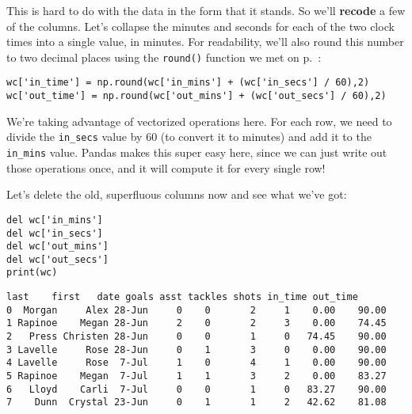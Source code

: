 
This is hard to do with the data in the form that it stands. So we'll
\textbf{recode} a few of the columns. Let's collapse the minutes and seconds
for each of the two clock times into a single value, in minutes. For
readability, we'll also round this number to two decimal places using the
\texttt{round()} function we met on p.~\pageref{round}:

\begin{Verbatim}[fontsize=\small,samepage=true,frame=single,framesep=3mm]
wc['in_time'] = np.round(wc['in_mins'] + (wc['in_secs'] / 60),2)
wc['out_time'] = np.round(wc['out_mins'] + (wc['out_secs'] / 60),2)
\end{Verbatim}


We're taking advantage of vectorized operations here. For each row, we need to
divide the \texttt{in\_secs} value by 60 (to convert it to minutes) and add it
to the \texttt{in\_mins} value. Pandas makes this super easy here, since we can
just write out those operations once, and it will compute it for every single
row!

\medskip
Let's delete the old, superfluous columns now and see what we've got:

\begin{samepage}
\begin{Verbatim}[fontsize=\small,samepage=true,frame=single,framesep=3mm]
del wc['in_mins']
del wc['in_secs']
del wc['out_mins']
del wc['out_secs']
print(wc)
\end{Verbatim}
\vspace{-.2in}

\begin{Verbatim}[fontsize=\footnotesize,samepage=true,frame=leftline,framesep=5mm,framerule=1mm]
     last    first   date goals asst tackles shots in_time out_time
0  Morgan     Alex 28-Jun     0    0       2     1    0.00    90.00
1 Rapinoe    Megan 28-Jun     2    0       2     3    0.00    74.45
2   Press Christen 28-Jun     0    0       1     0   74.45    90.00
3 Lavelle     Rose 28-Jun     0    1       3     0    0.00    90.00
4 Lavelle     Rose  7-Jul     1    0       4     1    0.00    90.00
5 Rapinoe    Megan  7-Jul     1    1       3     2    0.00    83.27
6   Lloyd    Carli  7-Jul     0    0       1     0   83.27    90.00
7    Dunn  Crystal 23-Jun     0    1       1     2   42.62    81.08
\end{Verbatim}
\end{samepage}

